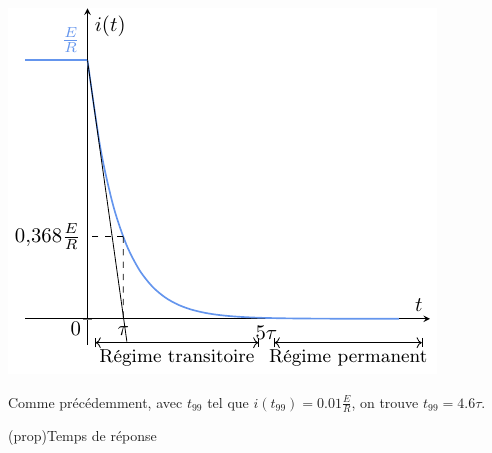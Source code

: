 \documentclass[../../main/main.tex]{subfiles}
\begin{document}
\begin{tcbraster}[raster columns=2, raster equal height=rows]
\begin{tcb}
{			\includegraphics[width=\linewidth]{carac_rl-tau_decharge}
		}
	\end{tcb}
\end{tcbraster}
Comme précédemment, avec $t_{99}$ tel que $i(t_{99}) = \num{0.01}\frac{E}{R}$,
on trouve $t_{99} = \num{4.6}\tau$.
\begin{tcb}(prop){Temps de réponse}
	{}
\end{tcb}
\end{document}
